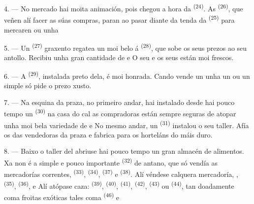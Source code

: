\VUsaut{4.0mm}
\VUsaut{3.0mm}

4. --- No mercado hai moita animación, pois chegou a hora da 
\textsuperscript{(24)}. As  \textsuperscript{(26)}, que veñen alí facer
as súas compras, paran ao pasar diante da tenda da  \textsuperscript{(25)}
para mercaren  ou unha 

5. --- Un  \textsuperscript{(27)} graxento regatea un  moi belo
á  \textsuperscript{(28)}, que sobe os seus prezos ao seu antollo. Recibiu
unha gran cantidade de  e
 O seu  e os seus  están moi
frescos.

\VUsaut{4.0mm}
\VUsaut{3.0mm}

6. --- A  \textsuperscript{(29)}, instalada preto dela, é moi
honrada. Cando vende un  unha  un  ou un simple
 só pide o prezo xusto.

7. --- Na esquina da praza, no primeiro andar, hai instalado desde hai pouco tempo un
 \textsuperscript{(30)} na casa do cal as compradoras están
sempre seguras de atopar unha moi bela variedade de 
 e  No mesmo andar, un
 \textsuperscript{(31)} instalou o seu taller. Afía os
 das vendedoras da praza e fabrica para os horteláns 
do  máis duro.

\VUsaut{4.0mm}
\VUsaut{3.0mm}

8. --- Baixo o taller del abriuse hai pouco tempo un gran almacén de alimentos. Xa non é a
simple e pouco importante  \textsuperscript{(32)} de antano, que só
vendía as mercadorías correntes,  \textsuperscript{(33)},
 \textsuperscript{(34)}, 
\textsuperscript{(37)} e  \textsuperscript{(38)}. Alí véndese calquera
mercadoría, ,  \textsuperscript{(35)},
 \textsuperscript{(36)}, 
 e  Alí atópase caza: 
\textsuperscript{(39)},  \textsuperscript{(40)}, 
\textsuperscript{(41)},  \textsuperscript{(42)}, 
\textsuperscript{(43)} ou  \textsuperscript{(44)}, tan doadamente coma froitas
exóticas tales coma  \textsuperscript{(46)} e 

